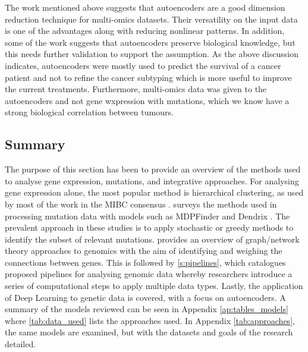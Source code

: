 
The work mentioned above suggests that autoencoders are a good dimension reduction technique for multi-omics datasets. Their versatility on the input data is one of the advantages along with reducing nonlinear patterns. In addition, some of the work suggests that autoencoders preserve biological knowledge, but this needs further validation to support the assumption. As the above discussion indicates, autoencoders were mostly used to predict the survival of a cancer patient and not to refine the cancer subtyping which is more useful to improve the current treatments. Furthermore, multi-omics data was given to the autoencoders and not gene wxpression with mutations, which we know have a strong biological correlation between tumours.

\subsection{Summary}

The purpose of this section has been to provide an overview of the methods used to analyse gene expression, mutations, and integrative approaches. For analysing gene expression alone, the most popular method is hierarchical clustering, as used by most of the work in the MIBC consensus \citep{Kamoun2020-tj}.  surveys the methods used in processing mutation data with models such as MDPFinder \citep{Zhao2012-wj} and Dendrix \citep{Vandin2012-cf}. The prevalent approach in these studies is to apply stochastic or greedy methods to identify the subset of relevant mutations.  provides an overview of graph/network theory approaches to genomics with the aim of identifying and weighing the connections between genes. This is followed by \cref{s:pipelines}, which catalogues proposed pipelines for analysing genomic data whereby researchers introduce a series of computational steps to apply multiple data types. Lastly, the application of Deep Learning to genetic data is covered, with a focus on autoencoders. A summary of the models reviewed can be seen in Appendix \cref{ap:tables_models} where \cref{tab:data_used} lists the approaches used. In Appendix \cref{tab:approaches}, the same models are examined, but with the datasets and goals of the research detailed.

